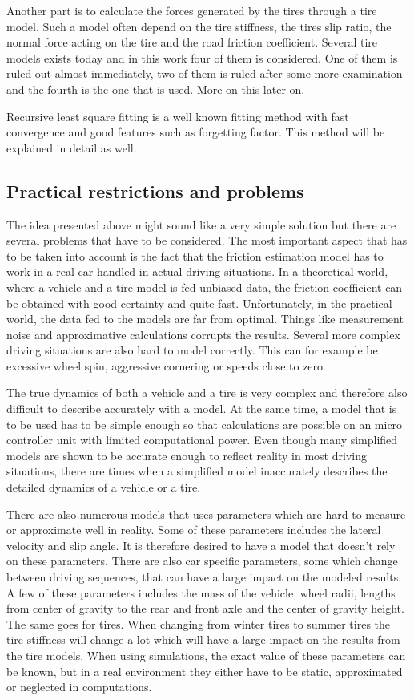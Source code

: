Another part is to calculate the forces generated by the tires through a tire model. Such a model often depend on the tire stiffness, the tires slip ratio, the normal force acting on the tire and the road friction coefficient. Several tire models exists today and in this work four of them is considered. One of them is ruled out almost immediately, two of them is ruled after some more examination and the fourth is the one that is used. More on this later on.

Recursive least square fitting is a well known fitting method with fast convergence and good features such as forgetting factor. This method will be explained in detail as well.

\subsection{Practical restrictions and problems}
The idea presented above might sound like a very simple solution but there are several problems that have to be considered. The most important aspect that has to be taken into account is the fact that the friction estimation model has to work in a real car handled in actual driving situations. In a theoretical world, where a vehicle and a tire model is fed unbiased data, the friction coefficient can be obtained with good certainty and quite fast. Unfortunately, in the practical world, the data fed to the models are far from optimal. Things like measurement noise and approximative calculations corrupts the results. Several more complex driving situations are also hard to model correctly. This can for example be excessive wheel spin, aggressive cornering or speeds close to zero.

The true dynamics of both a vehicle and a tire is very complex and therefore also difficult to describe accurately with a model. At the same time, a model that is to be used has to be simple enough so that calculations are possible on an micro controller unit with limited computational power. Even though many simplified models are shown to be accurate enough to reflect reality in most driving situations, there are times when a simplified model inaccurately describes the detailed dynamics of a vehicle or a tire. 

There are also numerous models that uses parameters which are hard to measure or approximate well in reality. Some of these parameters includes the lateral velocity and slip angle. It is therefore desired to have a model that doesn't rely on these parameters. There are also car specific parameters, some which change between driving sequences, that can have a large impact on the modeled results. A few of these parameters includes the mass of the vehicle, wheel radii, lengths from center of gravity to the rear and front axle and the center of gravity height. The same goes for tires. When changing from winter tires to summer tires the tire stiffness will change a lot which will have a large impact on the results from the tire models. When using simulations, the exact value of these parameters can be known, but in a real environment they either have to be static, approximated or neglected in computations.

